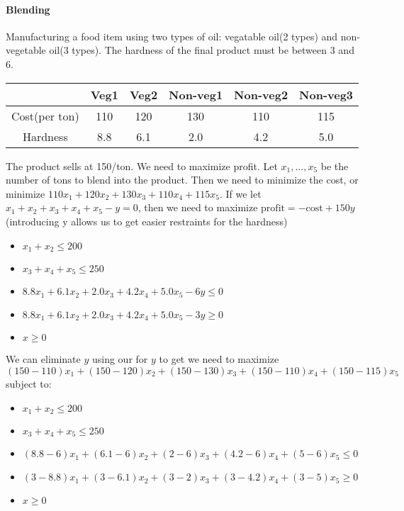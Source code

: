 \documentclass[10pt,letter]{article}
\theoremstyle{plain}
\theoremstyle{definition}
\begin{document}
\paragraph{Blending}
Manufacturing a food item using two types of oil: vegatable oil(2 types) and non-vegetable oil(3 types). The hardness of the final product must be between 3 and 6.  
\begin{tabular}{|cccccc|}\hline 
    &Veg1&Veg2&Non-veg1&Non-veg2&Non-veg3\\\hline 
    Cost(per ton)&110&120&130&110&115 \\\hline 
    Hardness & 8.8&6.1&2.0&4.2&5.0\end{tabular} 
    The product sells at 150/ton. We need to maximize profit. Let $x_1,\ldots,x_5$ be the number of tons to blend into the product. Then we need to minimize the cost, or minimize $110x_1+120x_2+130x_3+110x_4+115x_5$. If we let $x_1+x_2+x_3+x_4+x_5-y=0$, then we need to maximize $\text{profit}=-\text{cost}+150y$ (introducing y allows us to get easier restraints for the hardness) 
    \begin{itemize}
    \item$x_1+x_2\leq200$ 
    \item $x_3+x_4+x_5\leq250$
    \item $8.8x_1+6.1x_2+2.0x_3+4.2x_4+5.0x_5-6y\leq0$	 
    \item $8.8x_1+6.1x_2+2.0x_3+4.2x_4+5.0x_5-3y\geq0$ 	
    \item $x\geq0$ 
    \end{itemize}

We can eliminate $y$ using our for $y$ to get we need to maximize $(150-110)x_1+(150-120)x_2+(150-130)x_3+(150-110)x_4+(150-115)x_5$ subject to: 
\begin{itemize}
\item $x_1+x_2\leq200$ 	
\item $x_3+x_4+x_5\leq250$	
\item $(8.8-6)x_1+(6.1-6)x_2+(2-6)x_3+(4.2-6)x_4+(5-6)x_5\leq0$		
\item $(3-8.8)x_1+(3-6.1)x_2+(3-2)x_3+(3-4.2)x_4+(3-5)x_5\geq0$		
\item $x\geq0$ 
\end{itemize} 
\end{document}
